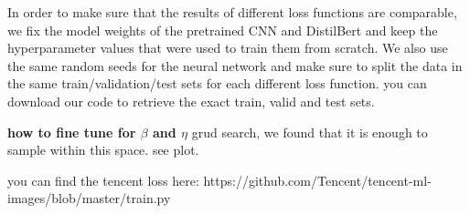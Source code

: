 In order to make sure that the results of different loss functions are comparable, we fix the model weights of the pretrained CNN and DistilBert and keep the hyperparameter values that were used to train them from scratch. We also use the same random seeds for the neural network and make sure to split the data in the same train/validation/test sets for each different loss function. you can download our code to retrieve the exact train, valid and test sets.

\textbf{how to fine tune for $\beta$ and $\eta$}
grud search, we found that it is enough to sample within this space. see plot.







you can find the tencent loss here: https://github.com/Tencent/tencent-ml-images/blob/master/train.py



